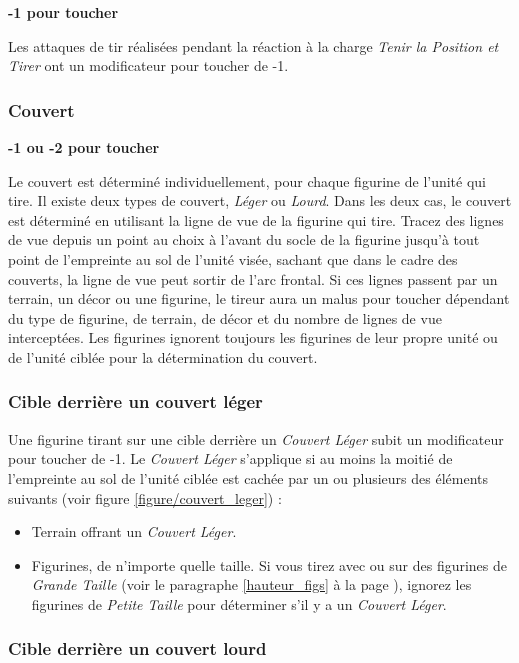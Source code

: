 \textbf{-1 pour toucher}

Les attaques de tir réalisées pendant la réaction à la charge \emph{Tenir la Position et Tirer} ont un modificateur pour toucher de -1.

\subsubsection*{Couvert}

\textbf{-1 ou -2 pour toucher}

Le couvert est déterminé individuellement, pour chaque figurine de l'unité qui tire. Il existe deux types de couvert, \emph{Léger} ou \emph{Lourd}. Dans les deux cas, le couvert est déterminé en utilisant la ligne de vue de la figurine qui tire. Tracez des lignes de vue depuis un point au choix à l'avant du socle de la figurine jusqu'à tout point de l'empreinte au sol de l'unité visée, sachant que dans le cadre des couverts, la ligne de vue peut sortir de l'arc frontal. Si ces lignes passent par un terrain, un décor ou une figurine, le tireur aura un malus pour toucher dépendant du type de figurine, de terrain, de décor et du nombre de lignes de vue interceptées. Les figurines ignorent toujours les figurines de leur propre unité ou de l'unité ciblée pour la détermination du couvert.

\subsubsection*{Cible derrière un couvert léger}

Une figurine tirant sur une cible derrière un \emph{Couvert Léger} subit un modificateur pour toucher de -1. Le \emph{Couvert Léger} s'applique si au moins la moitié de l'empreinte au sol de l'unité ciblée est cachée par un ou plusieurs des éléments suivants (voir figure \ref{figure/couvert_leger}) :
\begin{itemize}[label={-}]
\item Terrain offrant un \emph{Couvert Léger}.
\item Figurines, de n'importe quelle taille. Si vous tirez avec ou sur des figurines de \emph{Grande Taille} (voir le paragraphe \ref{hauteur_figs} à la page \pageref{hauteur_figs}), ignorez les figurines de \emph{Petite Taille} pour déterminer s'il y a un \emph{Couvert Léger}.
\end{itemize}

\subsubsection*{Cible derrière un couvert lourd}

